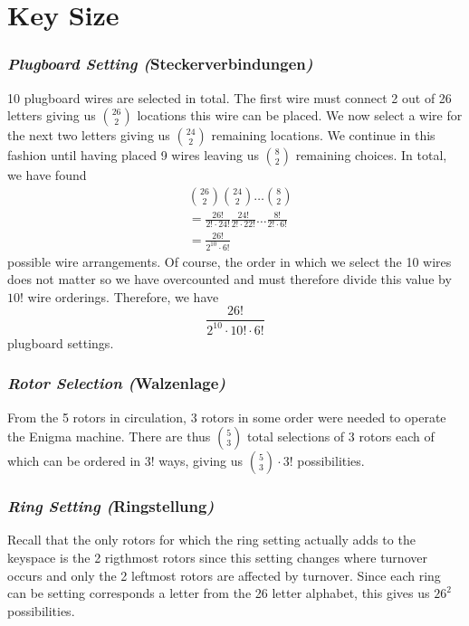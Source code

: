 \section{Key Size}

\subsubsection{\emph{Plugboard Setting (}Steckerverbindungen\emph{)}}
10 plugboard wires are selected in total. The first wire must connect
2 out of 26 letters giving us ${26\choose2}$ locations this wire can
be placed. We now select a wire for the next two letters giving us
${24\choose2}$ remaining locations. We continue in this fashion until
having placed 9 wires leaving us ${8\choose2}$ remaining choices. In
total, we have found
\begin{align*}
  & {26\choose2}{24\choose2}\dots{8\choose2}                                  \\
  & =\frac{26!}{2!\cdot 24!}\frac{24!}{2!\cdot 22!}\dots\frac{8!}{2!\cdot 6!} \\
  & =\frac{26!}{2^{10}\cdot6!}
\end{align*}
possible wire arrangements. Of course, the order in which we select
the 10 wires does not matter so we have overcounted and must
therefore divide this value by $10!$ wire orderings. Therefore, we have
\[
  \frac{26!}{2^{10}\cdot 10! \cdot 6!}
\]
plugboard settings.

\subsubsection{\emph{Rotor Selection (}Walzenlage\emph{)}}
From the 5 rotors in circulation, 3 rotors in some order were needed
to operate the Enigma machine. There are thus ${5}\choose{3}$ total
selections of 3 rotors each of which can be ordered in $3!$ ways,
giving us ${5\choose3}\cdot{3!}$ possibilities.

\subsubsection{\emph{Ring Setting (}Ringstellung\emph{)}}
Recall that the only rotors for which the ring setting actually adds
to the keyspace is the 2 rigthmost rotors since this setting changes
where turnover occurs and only the 2 leftmost rotors are affected by
turnover. Since each ring can be setting corresponds a letter from
the 26 letter alphabet, this gives us $26^2$ possibilities.

